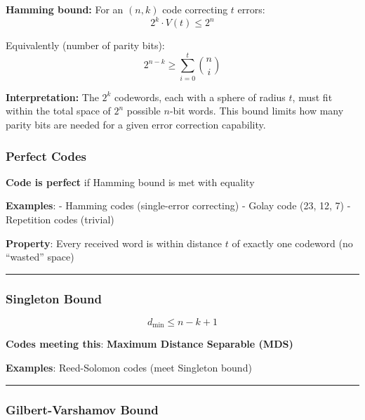 \textbf{Hamming bound:} For an $(n, k)$ code correcting $t$ errors:
\begin{equation}
2^k \cdot V(t) \leq 2^n
\label{eq:hamming-bound}
\end{equation}

Equivalently (number of parity bits):
\begin{equation}
2^{n-k} \geq \sum_{i=0}^{t} \binom{n}{i}
\label{eq:hamming-bound-parity}
\end{equation}

\textbf{Interpretation:} The $2^k$ codewords, each with a sphere of radius $t$, must fit within the total space of $2^n$ possible $n$-bit words. This bound limits how many parity bits are needed for a given error correction capability.

\subsubsection{Perfect Codes}\label{perfect-codes}

\textbf{Code is perfect} if Hamming bound is met with equality

\textbf{Examples}: - Hamming codes (single-error correcting) - Golay
code (23, 12, 7) - Repetition codes (trivial)

\textbf{Property}: Every received word is within distance \(t\) of
exactly one codeword (no ``wasted'' space)

\begin{center}\rule{0.5\linewidth}{0.5pt}\end{center}

\subsubsection{Singleton Bound}\label{singleton-bound}

\[
d_{\min} \leq n - k + 1
\]

\textbf{Codes meeting this}: \textbf{Maximum Distance Separable (MDS)}

\textbf{Examples}: Reed-Solomon codes (meet Singleton bound)

\begin{center}\rule{0.5\linewidth}{0.5pt}\end{center}

\subsubsection{Gilbert-Varshamov Bound}\label{gilbert-varshamov-bound}

